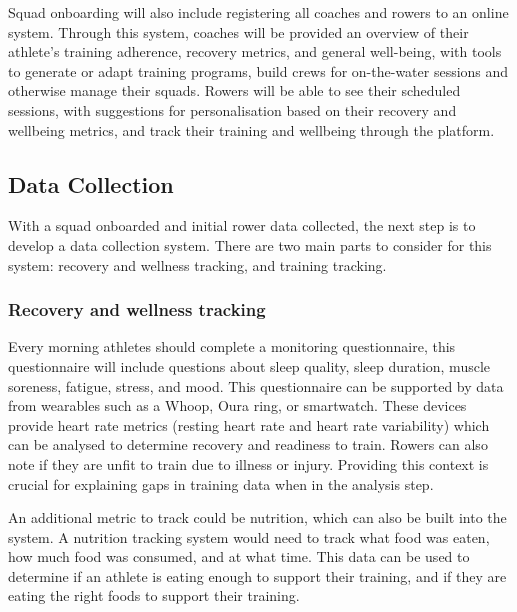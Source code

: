 Squad onboarding will also include registering all coaches and rowers to an online system. Through this system, coaches will be provided an overview of their athlete's training adherence, recovery metrics, and general well-being, with tools to generate or adapt training programs, build crews for on-the-water sessions and otherwise manage their squads. Rowers will be able to see their scheduled sessions, with suggestions for personalisation based on their recovery and wellbeing metrics, and track their training and wellbeing through the platform.

\subsection{\label{sub:ideal-data-collection}Data Collection}
With a squad onboarded and initial rower data collected, the next step is to develop a data collection system. There are two main parts to consider for this system: recovery and wellness tracking, and training tracking.

\subsubsection{Recovery and wellness tracking}
Every morning athletes should complete a monitoring questionnaire, this questionnaire will include questions about sleep quality, sleep duration, muscle soreness, fatigue, stress, and mood. This questionnaire can be supported by data from wearables such as a Whoop, Oura ring, or smartwatch. These devices provide heart rate metrics (resting heart rate and heart rate variability) which can be analysed to determine recovery and readiness to train. Rowers can also note if they are unfit to train due to illness or injury. Providing this context is crucial for explaining gaps in training data when in the analysis step.

An additional metric to track could be nutrition, which can also be built into the system. A nutrition tracking system would need to track what food was eaten, how much food was consumed, and at what time. This data can be used to determine if an athlete is eating enough to support their training, and if they are eating the right foods to support their training.

